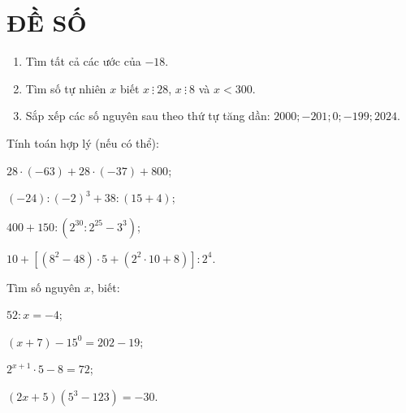\section{ĐỀ SỐ \thesection } %
\setcounter{bt}{0}

\begin{bt} \textbf{ }
	\begin{enumerate}
		\item Tìm tất cả các ước của $-18$.
		\item Tìm số tự nhiên $x$ biết $x\ \vdots \ 28$, $x \ \vdots \ 8$ và $x<300$.
		\item Sắp xếp các số nguyên sau theo thứ tự tăng dần: $2000;-201;0;-199;2024$. 
	\end{enumerate}
\end{bt}


\begin{bt} Tính toán hợp lý (nếu có thể):
	\begin{listEX}[2]
			\item $28\cdot(-63)+28\cdot(-37)+800$;
			\item $(-24):(-2)^3+38:(15+4)$;
			\item $400+150:\left( 2^{30}:2^{25}-3^3\right)  $;
			\item $10+\left[ \left( 8^2-48\right) \cdot5+\left( 2^2\cdot10+8\right) \right] :2^4$.
	\end{listEX}
\end{bt}



\begin{bt} Tìm số nguyên $x$, biết:
	\begin{listEX}[2]
			\item $52:x=-4$;
			\item $(x+7)-15^0=202-19$;
			\item $2^{x+1}\cdot5-8=72$;
			\item $(2x+5)(5^3-123)=-30$.
	\end{listEX}
\end{bt}


